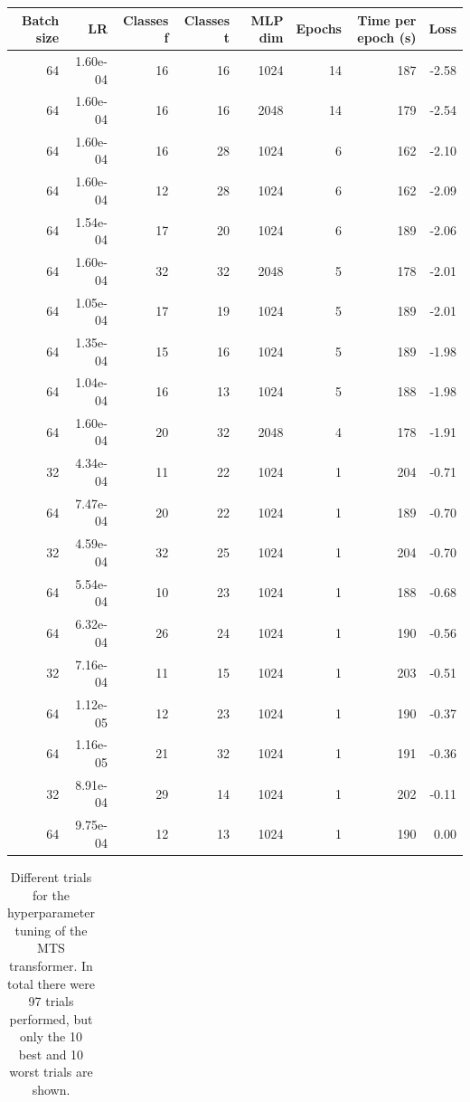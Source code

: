 \begin{appendices}
\begin{table}
\begin{tabular}{rrrrrrrr}
\multicolumn{1}{p{0.5cm}}{\raggedleft Batch size} & 
\multicolumn{1}{p{0.5cm}}{\raggedleft LR} & 
\multicolumn{1}{p{1.0cm}}{\raggedleft Classes f} & 
\multicolumn{1}{p{1.0cm}}{\raggedleft Classes t} & 
\multicolumn{1}{p{0.5cm}}{\raggedleft MLP dim} & 
\multicolumn{1}{p{1.0cm}}{\raggedleft Epochs} & 
\multicolumn{1}{p{1.5cm}}{\raggedleft Time per epoch (s)} & 
\multicolumn{1}{p{0.5cm}}{\raggedleft Loss} \\
\midrule
64 & 1.60e-04 & 16 & 16 & 1024 & 14 & 187 & -2.58 \\
64 & 1.60e-04 & 16 & 16 & 2048 & 14 & 179 & -2.54 \\
64 & 1.60e-04 & 16 & 28 & 1024 & 6 & 162 & -2.10 \\
64 & 1.60e-04 & 12 & 28 & 1024 & 6 & 162 & -2.09 \\
64 & 1.54e-04 & 17 & 20 & 1024 & 6 & 189 & -2.06 \\
64 & 1.60e-04 & 32 & 32 & 2048 & 5 & 178 & -2.01 \\
64 & 1.05e-04 & 17 & 19 & 1024 & 5 & 189 & -2.01 \\
64 & 1.35e-04 & 15 & 16 & 1024 & 5 & 189 & -1.98 \\
64 & 1.04e-04 & 16 & 13 & 1024 & 5 & 188 & -1.98 \\
64 & 1.60e-04 & 20 & 32 & 2048 & 4 & 178 & -1.91 \\
\midrule
32 & 4.34e-04 & 11 & 22 & 1024 & 1 & 204 & -0.71 \\
64 & 7.47e-04 & 20 & 22 & 1024 & 1 & 189 & -0.70 \\
32 & 4.59e-04 & 32 & 25 & 1024 & 1 & 204 & -0.70 \\
64 & 5.54e-04 & 10 & 23 & 1024 & 1 & 188 & -0.68 \\
64 & 6.32e-04 & 26 & 24 & 1024 & 1 & 190 & -0.56 \\
32 & 7.16e-04 & 11 & 15 & 1024 & 1 & 203 & -0.51 \\
64 & 1.12e-05 & 12 & 23 & 1024 & 1 & 190 & -0.37 \\
64 & 1.16e-05 & 21 & 32 & 1024 & 1 & 191 & -0.36 \\
32 & 8.91e-04 & 29 & 14 & 1024 & 1 & 202 & -0.11 \\
64 & 9.75e-04 & 12 & 13 & 1024 & 1 & 190 & 0.00 \\
\bottomrule
\end{tabular}
\end{table}

\begin{table}
\caption{Different trials for the hyperparameter tuning of the MTS transformer. In total there were 97 trials performed, but only the 10 best and 10 worst trials are shown.}
\label{tab:hyperparams_mts}
\begin{tabular}{rrrrrrrrrrr}
\toprule


\end{tabular}
\end{table}
\end{appendices}

